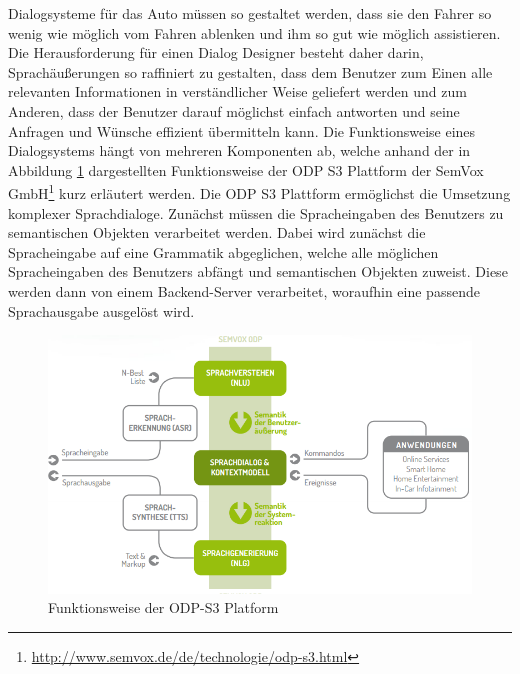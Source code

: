 \documentclass[12pt,a4paper]{scrartcl}
\begin{document}
Dialogsysteme für das Auto müssen so gestaltet werden, dass sie den Fahrer so wenig wie möglich vom Fahren ablenken und ihm so gut wie möglich assistieren. Die Herausforderung für einen Dialog Designer besteht daher darin, Sprachäußerungen so raffiniert zu gestalten, dass dem Benutzer zum Einen alle relevanten Informationen in verständlicher Weise geliefert werden und zum Anderen, dass der Benutzer darauf möglichst einfach antworten und seine Anfragen und Wünsche effizient übermitteln kann. Die Funktionsweise eines Dialogsystems hängt von mehreren Komponenten ab, welche anhand der in Abbildung \ref{odps3} dargestellten Funktionsweise der ODP S3 Plattform der SemVox GmbH\footnote{\label{foot:odps3}\url{http://www.semvox.de/de/technologie/odp-s3.html}} kurz erläutert werden. Die ODP S3 Plattform ermöglichst die Umsetzung komplexer Sprachdialoge.  
Zunächst müssen die Spracheingaben des Benutzers zu semantischen Objekten verarbeitet werden. Dabei wird zunächst die Spracheingabe auf eine Grammatik abgeglichen, welche alle möglichen Spracheingaben des Benutzers abfängt und semantischen Objekten zuweist. Diese werden dann von einem Backend-Server verarbeitet, woraufhin eine passende Sprachausgabe ausgelöst wird. 
\begin{figure}[htbp]
\begin{center}
\includegraphics[width=12cm]{odps3.png}
\caption{Funktionsweise der ODP-S3 Platform}
\label{odps3}
\end{center}
\end{figure}
\end{document}
